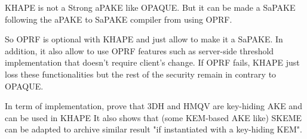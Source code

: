 \documentclass[../report.tex]{subfiles}
\begin{document}


KHAPE is not a Strong aPAKE like OPAQUE. But it can be made a SaPAKE following the aPAKE to SaPAKE compiler from \cite{OPAQUE_Paper} using OPRF.

So OPRF is optional with KHAPE and just allow to make it a SaPAKE. In addition, it also allow to use OPRF features such as server-side threshold implementation that doesn't require client's change. If OPRF fails, KHAPE just loss these functionalities but the rest of the security remain in contrary to OPAQUE.


In term of implementation, \cite{KHAPE_Paper} prove that 3DH and HMQV are key-hiding AKE and can be used in KHAPE %
It also shows that (some KEM-based AKE like) SKEME can be adapted to archive similar result "if instantiated with a key-hiding KEM". %


% 
% 


\end{document}
